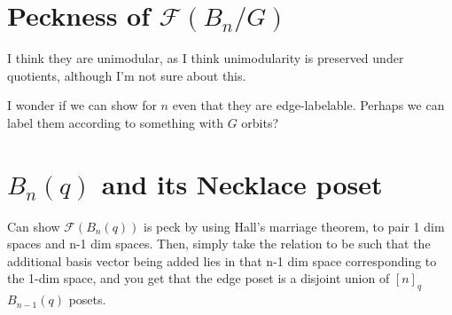 \documentclass{amsart}
\begin{document}
\section{Peckness of $\mathcal F(B_n/G)$}

I think they are unimodular, as I think unimodularity is preserved under quotients, although I'm not sure about this.

I wonder if we can show for $n$ even that they are edge-labelable. Perhaps we can label them according to something with $G$ orbits?


\section{$B_n(q)$ and its Necklace poset}

Can show $\mathcal F(B_n(q))$ is peck by using Hall's marriage theorem, to pair 1 dim spaces and n-1 dim spaces. Then, simply take the relation to be such that the additional basis vector being added lies in that n-1 dim space corresponding to the 1-dim space, and you get that the edge poset is a disjoint union of $[n]_q$ $B_{n-1}(q)$ posets. 
\end{document}
